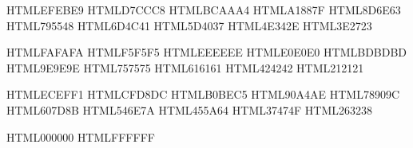 \definecolor{Brown-50}        {HTML}{EFEBE9}
\definecolor{Brown-100}       {HTML}{D7CCC8}
\definecolor{Brown-200}       {HTML}{BCAAA4}
\definecolor{Brown-300}       {HTML}{A1887F}
\definecolor{Brown-400}       {HTML}{8D6E63}
\definecolor{Brown-500}       {HTML}{795548}
\definecolor{Brown-600}       {HTML}{6D4C41}
\definecolor{Brown-700}       {HTML}{5D4037}
\definecolor{Brown-800}       {HTML}{4E342E}
\definecolor{Brown-900}       {HTML}{3E2723}

\definecolor{Gray-50}         {HTML}{FAFAFA}
\definecolor{Gray-100}        {HTML}{F5F5F5}
\definecolor{Gray-200}        {HTML}{EEEEEE}
\definecolor{Gray-300}        {HTML}{E0E0E0}
\definecolor{Gray-400}        {HTML}{BDBDBD}
\definecolor{Gray-500}        {HTML}{9E9E9E}
\definecolor{Gray-600}        {HTML}{757575}
\definecolor{Gray-700}        {HTML}{616161}
\definecolor{Gray-800}        {HTML}{424242}
\definecolor{Gray-900}        {HTML}{212121}

\definecolor{Blue-Gray-50}    {HTML}{ECEFF1}
\definecolor{Blue-Gray-100}   {HTML}{CFD8DC}
\definecolor{Blue-Gray-200}   {HTML}{B0BEC5}
\definecolor{Blue-Gray-300}   {HTML}{90A4AE}
\definecolor{Blue-Gray-400}   {HTML}{78909C}
\definecolor{Blue-Gray-500}   {HTML}{607D8B}
\definecolor{Blue-Gray-600}   {HTML}{546E7A}
\definecolor{Blue-Gray-700}   {HTML}{455A64}
\definecolor{Blue-Gray-800}   {HTML}{37474F}
\definecolor{Blue-Gray-900}   {HTML}{263238}

\definecolor{Black}           {HTML}{000000}
\definecolor{White}           {HTML}{FFFFFF}
